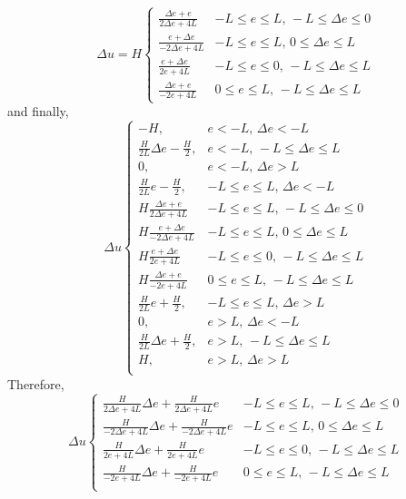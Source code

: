 \begin{equation}
    \Delta u=H\begin{cases}
    \frac{\Delta e+e}{2\Delta e+4L} & -L\leq e\leq L,\,-L\leq \Delta e\leq 0 \\
    \frac{e+\Delta e}{-2\Delta e+4L} & -L\leq e\leq L,\,0\leq \Delta e\leq L \\
    \frac{e+\Delta e}{2e+4L}& -L\leq e\leq 0,\,-L\leq \Delta e\leq L \\
    \frac{\Delta e+e}{-2e+4L} & 0\leq e\leq L,\,-L\leq \Delta e\leq L 
\end{cases}
\end{equation}
and finally,
\begin{equation}
\Delta u\begin{cases}
    -H,& e<-L,\,\Delta e<-L\\
    \frac{H}{2L}\Delta e-\frac{H}{2},& e<-L,\,-L\leq \Delta e\leq L\\
    0,& e<-L,\,\Delta e>L\\
    \frac{H}{2L}e-\frac{H}{2},& -L\leq e\leq L,\,\Delta e<-L\\
    H\frac{\Delta e+e}{2\Delta e+4L} & -L\leq e\leq L,\,-L\leq \Delta e\leq 0 \\
    H\frac{e+\Delta e}{-2\Delta e+4L} & -L\leq e\leq L,\,0\leq \Delta e\leq L \\
    H\frac{e+\Delta e}{2e+4L}& -L\leq e\leq 0,\,-L\leq \Delta e\leq L \\
    H\frac{\Delta e+e}{-2e+4L} & 0\leq e\leq L,\,-L\leq \Delta e\leq L \\
    \frac{H}{2L}e+\frac{H}{2},& -L\leq e\leq L,\,\Delta e>L\\
    0,& e>L,\,\Delta e<-L\\
    \frac{H}{2L}\Delta e+\frac{H}{2},& e>L,\,-L\leq \Delta e\leq L\\
    H,& e>L,\,\Delta e>L\\
\end{cases}
\end{equation}
Therefore,
\begin{equation}
\Delta u\begin{cases}
    \frac{H}{2\Delta e+4L}\Delta e+\frac{H}{2\Delta e+4L}e & -L\leq e\leq L,\,-L\leq \Delta e\leq 0 \\
    \frac{H}{-2\Delta e+4L}\Delta e+\frac{H}{-2\Delta e+4L}e & -L\leq e\leq L,\,0\leq \Delta e\leq L \\
    \frac{H}{2e+4L}\Delta e+\frac{H}{2e+4L}e& -L\leq e\leq 0,\,-L\leq \Delta e\leq L \\
    \frac{H}{-2e+4L}\Delta e+\frac{H}{-2e+4L}e& 0\leq e\leq L,\,-L\leq \Delta e\leq L \\
\end{cases}
\end{equation}

